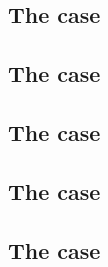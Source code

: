 \subsection{The \instEcrecover{} case}    \label{ec data: ecrecover}    
\subsection{The \instEcadd{}     case}    \label{ec data: ecadd}        
\subsection{The \instEcmul{}     case}    \label{ec data: ecmul}        
\subsection{The \instEcpairing{} case}    \label{ec data: ecpairing}    
\subsection{The \instPVerify{}   case}    \label{ec data: pverify}      

